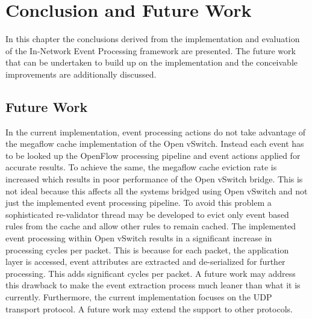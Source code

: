 \chapter{Conclusion and Future Work}
In this chapter the conclusions derived from the implementation and evaluation of the In-Network Event Processing framework are presented. The future work that can be undertaken to build up on the implementation and the conceivable improvements are additionally discussed. 

\section{Future Work}
In the current implementation, event processing actions do not take advantage of the megaflow cache implementation of the Open vSwitch. Instead each event has to be looked up the OpenFlow processing pipeline and event actions applied for accurate results. To achieve the same, the megaflow cache eviction rate is increased which results in poor performance of the Open vSwitch bridge. This is not ideal because this affects all the systems bridged using Open vSwitch and not just the implemented event processing pipeline. To avoid this problem a sophisticated re-validator thread may be developed to evict only event based rules from the cache and allow other rules to remain cached. \newline
The implemented event processing within Open vSwitch results in a significant increase in processing cycles per packet. This is because for each packet, the application layer is accessed, event attributes are extracted and de-serialized for further processing. This adds significant cycles per packet. A future work may address this drawback to make the event extraction process much leaner than what it is currently.\newline
Furthermore, the current implementation focuses on the UDP transport protocol. A future work may extend the support to other protocols.


